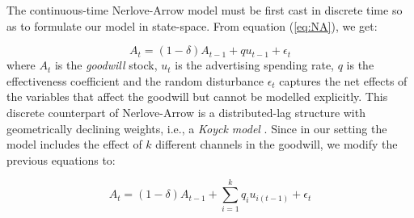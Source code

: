 The continuous-time Nerlove-Arrow model must be first cast in discrete time so as to formulate our model in state-space. From equation (\ref{eq:NA}), we get:

$$
A_t =  (1-\delta) A_{t-1} + q u_{t-1} + \epsilon_t 
$$
where $A_t$ is the \emph{goodwill} stock, $u_t$ is the advertising spending rate, $q$ is the effectiveness coefficient and the random disturbance $\epsilon_t$  captures the net effects of the variables that affect the goodwill  but cannot be modelled explicitly.  This discrete counterpart of Nerlove-Arrow is a distributed-lag structure with geometrically declining weights, i.e., a \emph{Koyck model} \parencite{clarke1976econometric, koyck1954distributed}. Since in our setting the model includes the effect of $k$ different channels in the goodwill, we modify the previous equations to:

$$
A_t =  (1-\delta) A_{t-1} + \sum_{i=1}^k q_i u_{i(t-1)} + \epsilon_t 
$$

